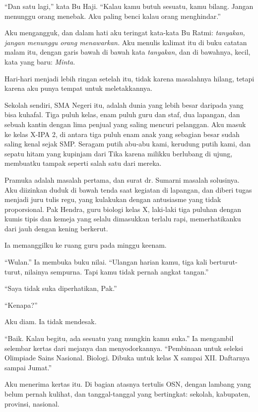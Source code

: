 \documentclass[11pt,twoside,openany]{book}
\makeatletter
\newcommand{\scenebreak}{\par\vspace{0.9em}{\centering\textsc{*\hspace{0.7em}*\hspace{0.7em}*}\par}\vspace{0.9em}\@afterindentfalse\@afterheading}
\makeatother
\begin{document}
``Dan satu lagi,'' kata Bu Haji. ``Kalau kamu butuh sesuatu, kamu bilang. Jangan menunggu orang menebak. Aku paling benci kalau orang menghindar.''

Aku mengangguk, dan dalam hati aku teringat kata-kata Bu Ratmi: \emph{tanyakan, jangan menunggu orang menawarkan.} Aku menulis kalimat itu di buku catatan malam itu, dengan garis bawah di bawah kata \emph{tanyakan}, dan di bawahnya, kecil, kata yang baru: \emph{Minta.}

\scenebreak
Hari-hari menjadi lebih ringan setelah itu, tidak karena masalahnya hilang, tetapi karena aku punya tempat untuk meletakkannya.

Sekolah sendiri, SMA Negeri itu, adalah dunia yang lebih besar daripada yang bisa kuhafal. Tiga puluh kelas, enam puluh guru dan staf, dua lapangan, dan sebuah kantin dengan lima penjual yang saling mencuri pelanggan. Aku masuk ke kelas X-IPA 2, di antara tiga puluh enam anak yang sebagian besar sudah saling kenal sejak SMP. Seragam putih abu-abu kami, kerudung putih kami, dan sepatu hitam yang kupinjam dari Tika karena milikku berlubang di ujung, membuatku tampak seperti salah satu dari mereka.

Pramuka adalah masalah pertama, dan surat dr. Sumarni masalah solusinya. Aku diizinkan duduk di bawah tenda saat kegiatan di lapangan, dan diberi tugas menjadi juru tulis regu, yang kulakukan dengan antusiasme yang tidak proporsional. Pak Hendra, guru biologi kelas X, laki-laki tiga puluhan dengan kumis tipis dan kemeja yang selalu dimasukkan terlalu rapi, memerhatikanku dari jauh dengan kening berkerut.

Ia memanggilku ke ruang guru pada minggu keenam.

``Wulan.'' Ia membuka buku nilai. ``Ulangan harian kamu, tiga kali berturut-turut, nilainya sempurna. Tapi kamu tidak pernah angkat tangan.''

``Saya tidak suka diperhatikan, Pak.''

``Kenapa?''

Aku diam. Ia tidak mendesak.

``Baik. Kalau begitu, ada sesuatu yang mungkin kamu suka.'' Ia mengambil selembar kertas dari mejanya dan menyodorkannya. ``Pembinaan untuk seleksi Olimpiade Sains Nasional. Biologi. Dibuka untuk kelas X sampai XII. Daftarnya sampai Jumat.''

Aku menerima kertas itu. Di bagian atasnya tertulis OSN, dengan lambang yang belum pernah kulihat, dan tanggal-tanggal yang bertingkat: sekolah, kabupaten, provinsi, nasional.
\end{document}
